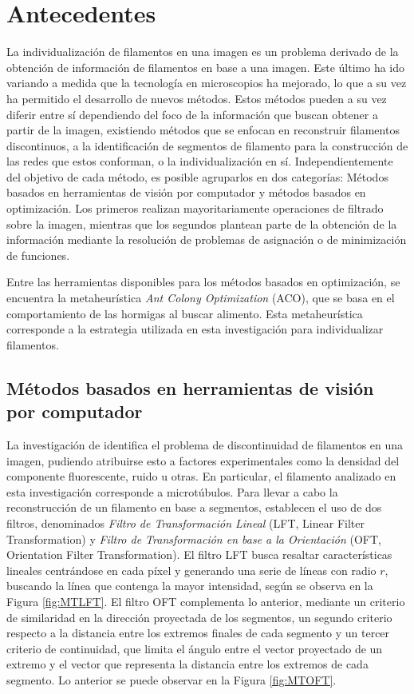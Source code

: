 \chapter{Antecedentes}
\label{chap:stateoftheart}
La individualizaci\'on de filamentos en una imagen es un problema derivado de la obtenci\'on de informaci\'on de filamentos en base a una imagen. Este \'ultimo ha ido variando a medida que la tecnolog\'ia en microscopios ha mejorado, lo que a su vez ha permitido el desarrollo de nuevos m\'etodos. Estos m\'etodos pueden a su vez diferir entre s\'i dependiendo del foco de la informaci\'on que buscan obtener a partir de la imagen, existiendo m\'etodos que se enfocan en reconstruir filamentos discontinuos, a la identificaci\'on de segmentos de filamento para la construcci\'on de las redes que estos conforman, o la individualizaci\'on en s\'i. Independientemente del objetivo de cada m\'etodo, es posible agruparlos en dos categor\'ias: M\'etodos basados en herramientas de visi\'on por computador y m\'etodos basados en optimizaci\'on. Los primeros realizan mayoritariamente operaciones de filtrado sobre la imagen, mientras que los segundos plantean parte de la obtenci\'on de la informaci\'on mediante la resoluci\'on de problemas de asignaci\'on o de minimizaci\'on de funciones.

Entre las herramientas disponibles para los m\'etodos basados en optimizaci\'on, se encuentra la metaheur\'istica {\it Ant Colony Optimization} (ACO), que se basa en el comportamiento de las hormigas al buscar alimento. Esta metaheur\'istica corresponde a la estrategia utilizada en esta investigaci\'on para individualizar filamentos.


\section{M\'etodos basados en herramientas de visi\'on por computador}
\label{sec:NonIndividualizationMethods}

La investigaci\'on de \citet{zhang2017extracting} identifica el problema de discontinuidad de filamentos en una imagen, pudiendo atribuirse esto a factores experimentales como la densidad del componente fluorescente, ruido u otras. En particular, el filamento analizado en esta investigaci\'on corresponde a microt\'ubulos. Para llevar a cabo la reconstrucci\'on de un filamento en base a segmentos, establecen el uso de dos filtros, denominados \textit{Filtro de Transformaci\'on Lineal} (LFT, Linear Filter Transformation) y \textit{Filtro de Transformaci\'on en base a la Orientaci\'on} (OFT, Orientation Filter Transformation). 
El filtro LFT busca resaltar caracter\'isticas lineales centr\'andose en cada p\'ixel y generando una serie de l\'ineas con radio $r$, buscando la l\'inea que contenga la mayor intensidad, seg\'un se observa en la Figura \ref{fig:MTLFT}. El filtro OFT complementa lo anterior, mediante un criterio de similaridad en la direcci\'on proyectada de los segmentos, un segundo criterio respecto a la distancia entre los extremos finales de cada segmento y un tercer criterio de continuidad, que limita el \'angulo entre el vector proyectado de un extremo y el vector que representa la distancia entre los extremos de cada segmento. Lo anterior se puede observar en la Figura \ref{fig:MTOFT}.


